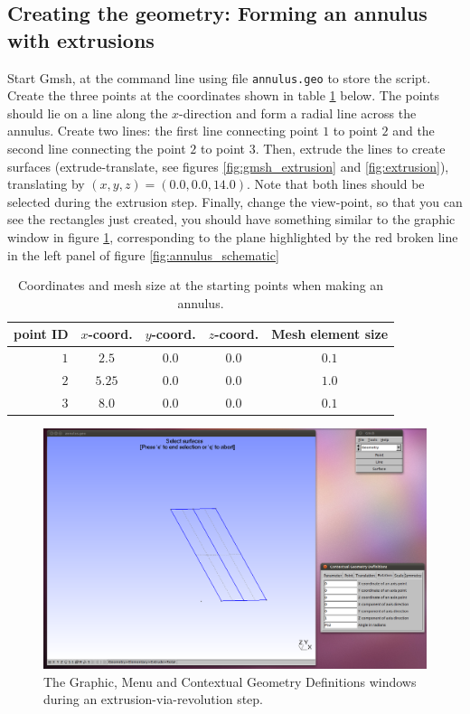 \subsection{Creating the geometry: Forming an annulus with extrusions}
\label{ssect:annulus_via_extrusions}
\par
Start Gmsh, at the command line using file \lstinline+annulus.geo+ to store the script. Create the three
points at the coordinates shown in table \ref{table:annulus_starting_points} below. The points should
lie on a line along the $x$-direction and form a radial line across the annulus. Create two lines: the
first line connecting point $1$ to point $2$ and the second
line connecting the point $2$ to point $3$. Then, extrude the lines to create surfaces
(extrude-translate, see figures \ref{fig:gmsh_extrusion} and \ref{fig:extrusion}), translating
by $(x,y,z)=(0.0, 0.0, 14.0)$. Note that both lines should be selected during the extrusion step.
Finally, change the view-point, so that you can see the rectangles just created, you should have
something similar to the graphic window in figure \ref{fig:extruding_red_plane}, corresponding to
the plane highlighted by the red broken line in the left panel of figure \ref{fig:annulus_schematic}
\begin{table}[htdp]
  \caption{Coordinates and mesh size at the starting points when making an annulus.}
  \centering
  \begin{tabular}{|r|c|c|c|c|}\hline
  point ID & $x$-coord. & $y$-coord. & $z$-coord. & Mesh element size \\ \hline
  $1$      & $2.5$      & $0.0$      & $0.0$      & $0.1$ \\ \hline
  $2$      & $5.25$     & $0.0$      & $0.0$      & $1.0$ \\ \hline
  $3$      & $8.0$      & $0.0$      & $0.0$      & $0.1$ \\ \hline
  \end{tabular}
  \label{table:annulus_starting_points}
\end{table}
\begin{figure}[htbp]
 \centering
  \includegraphics[width=1.0\textwidth]{../figures/shot17.png}
  \caption{The Graphic, Menu and Contextual Geometry Definitions windows during an 
                extrusion-via-revolution step.}
  \label{fig:extruding_red_plane}
\end{figure}
